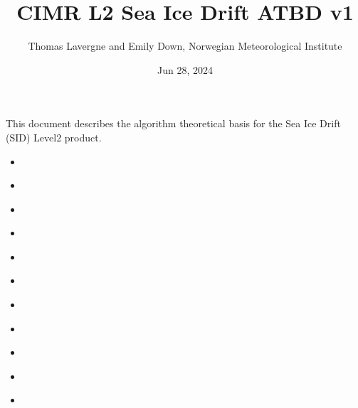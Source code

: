 \documentclass[letterpaper,10pt,english]{jupyterBook}
\title{CIMR L2 Sea Ice Drift ATBD v1}
\date{Jun 28, 2024}
\author{Thomas Lavergne and Emily Down, Norwegian Meteorological Institute}
\begin{document}
\pagestyle{empty}
\sphinxmaketitle
\pagestyle{plain}
\sphinxtableofcontents
\pagestyle{normal}
\label{\detokenize{intro::doc}}


\sphinxAtStartPar
This document describes the algorithm theoretical basis for the Sea Ice Drift (SID) Level\sphinxhyphen{}2 product.
\begin{itemize}
\item {} 
\sphinxAtStartPar
{\hyperref[\detokenize{abstract::doc}]{}}

\item {} 
\sphinxAtStartPar
{\hyperref[\detokenize{applicable_ref_docs::doc}]{}}

\item {} 
\sphinxAtStartPar
{\hyperref[\detokenize{acronyms::doc}]{}}

\item {} 
\sphinxAtStartPar
{\hyperref[\detokenize{definitions::doc}]{}}

\item {} 
\sphinxAtStartPar
{\hyperref[\detokenize{introduction_purpose_scope::doc}]{}}

\item {} 
\sphinxAtStartPar
{\hyperref[\detokenize{background_justification_algorithm::doc}]{}}

\item {} 
\sphinxAtStartPar
{\hyperref[\detokenize{L2_product_definition::doc}]{}}

\item {} 
\sphinxAtStartPar
{\hyperref[\detokenize{baseline_algorithm_definition::doc}]{}}

\item {} 
\sphinxAtStartPar
{\hyperref[\detokenize{algorithm_input_output_data_definition::doc}]{}}

\item {} 
\sphinxAtStartPar
{\hyperref[\detokenize{CIMR_L2_Sea_Ice_Drift_preproc::doc}]{}}

\item {} 
\sphinxAtStartPar
{\hyperref[\detokenize{CIMR_L2_Sea_Ice_Drift_algorithm::doc}]{}}


\end{itemize}
\end{document}
